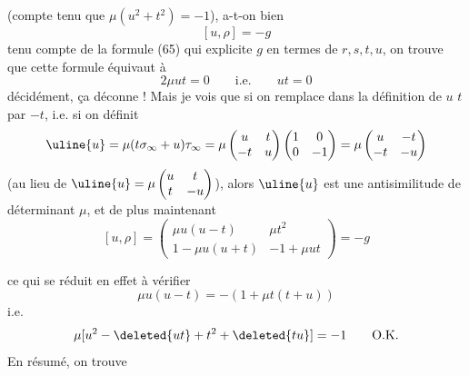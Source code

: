 (compte tenu que $\mu(u^2+t^2)=-1$),  a-t-on bien
\[
[u,\rho]=-g
\]
tenu
compte de la formule (65) qui explicite $g$ en
termes de $r,s,t,u$, on trouve que cette formule
 équivaut à
\[
2\mu ut=0\qquad\text{i.e.}\qquad ut=0
\]
décidément, ça déconne ! Mais je vois que si on
remplace dans la définition de $u$ $t$ par $-t$,
i.e. si on définit
\[
\uline{u}=\mu(t\sigma_\infty+u)\tau_\infty
=\mu\begin{pmatrix}u&t\\-t&u\end{pmatrix}
\begin{pmatrix}1&0\\0&-1\end{pmatrix}
=\mu\begin{pmatrix}u&-t\\-t&-u\end{pmatrix}
\]
(au lieu de $\uline{u}=\mu\begin{pmatrix}u&t\\t&-u\end{pmatrix}$),
alors $\uline{u}$ est 
une antisimilitude de déterminant $\mu$, et de
plus maintenant
\[
[u,\rho]=\begin{pmatrix}
\mu u(u-t)&\mu t^2\\
1-\mu u(u+t)&-1+\mu ut
\end{pmatrix}=-g
\]


ce qui se réduit en effet à vérifier
\[
\mu u(u-t)=-(1+\mu t(t+u))
\]
i.e.
\[
\mu[u^2-\deleted{ut}+t^2+\deleted{tu}]=-1
\qquad\text{O.K.}
\]
En résumé, on trouve

